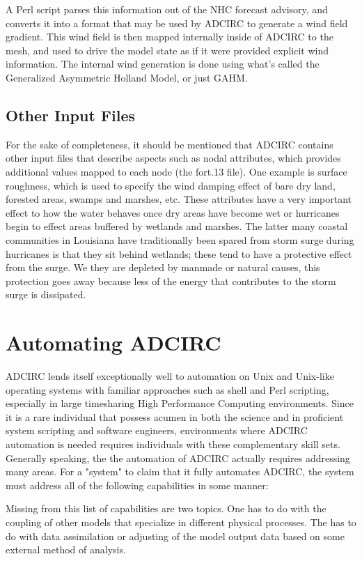 \documentclass{article}
\begin{document}
A Perl script parses this information out of the NHC forecast advisory, and
converts it into a format that may be used by ADCIRC to generate a wind field
gradient. This wind field is then mapped internally inside of ADCIRC to the
mesh, and used to drive the model state as if it were provided explicit wind
information. The internal wind generation is done using what’s called the
Generalized Asymmetric Holland Model, or just GAHM.

\subsection{Other Input Files}

For the sake of completeness, it should be mentioned that ADCIRC contains other
input files that describe aspects such as nodal attributes, which provides
additional values mapped to each node (the fort.13 file). One example is surface
roughness, which is used to specify the wind damping effect of bare dry land,
forested areas, swamps and marshes, etc. These attributes have a very important
effect to how the water behaves once dry areas have become wet or hurricanes
begin to effect areas buffered by wetlands and marshes. The latter many coastal
communities in Louisiana have traditionally been spared from storm surge during
hurricanes is that they sit behind wetlands; these tend to have a protective
effect from the surge. We they are depleted by manmade or natural causes, this
protection goes away because less of the energy that contributes to the storm
surge is dissipated.

\section{Automating ADCIRC}

ADCIRC lends itself exceptionally well to automation on Unix and Unix-like
operating systems with familiar approaches such as shell and Perl scripting,
especially in large timesharing High Performance Computing environments. Since
it is a rare individual that possess acumen in both the science and in
proficient system scripting and software engineers, environments where ADCIRC
automation is needed requires individuals with these complementary skill sets.
Generally speaking, the the automation of ADCIRC actually requires addressing
many areas. For a "system" to claim that it fully automates ADCIRC, the system
must address all of the following capabilities in some manner:

Missing from this list of capabilities are two topics. One has to do with the
coupling of other models that specialize in different physical processes. The
has to do with data assimilation or adjusting of the model output data based on
some external method of analysis.
\end{document}
